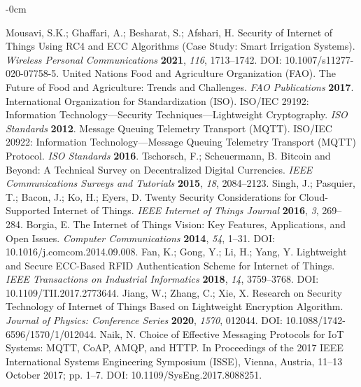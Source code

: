 \documentclass[journal]{Definitions/mdpi}
\begin{document}
\begin{adjustwidth}{-\extralength}{0cm}
\begin{thebibliography}{999}
Mousavi, S.K.; Ghaffari, A.; Besharat, S.; Afshari, H. Security of Internet of Things Using RC4 and ECC Algorithms (Case Study: Smart Irrigation Systems). {\em Wireless Personal Communications} {\bf 2021}, {\em 116}, 1713–1742. DOI: 10.1007/s11277-020-07758-5.
United Nations Food and Agriculture Organization (FAO). The Future of Food and Agriculture: Trends and Challenges. {\em FAO Publications} {\bf 2017}.
International Organization for Standardization (ISO). ISO/IEC 29192: Information Technology—Security Techniques—Lightweight Cryptography. {\em ISO Standards} {\bf 2012}.
Message Queuing Telemetry Transport (MQTT). ISO/IEC 20922: Information Technology—Message Queuing Telemetry Transport (MQTT) Protocol. {\em ISO Standards} {\bf 2016}.
Tschorsch, F.; Scheuermann, B. Bitcoin and Beyond: A Technical Survey on Decentralized Digital Currencies. {\em IEEE Communications Surveys and Tutorials} {\bf 2015}, {\em 18}, 2084–2123.
Singh, J.; Pasquier, T.; Bacon, J.; Ko, H.; Eyers, D. Twenty Security Considerations for Cloud-Supported Internet of Things. {\em IEEE Internet of Things Journal} {\bf 2016}, {\em 3}, 269–284.
Borgia, E. The Internet of Things Vision: Key Features, Applications, and Open Issues. {\em Computer Communications} {\bf 2014}, {\em 54}, 1–31. DOI: 10.1016/j.comcom.2014.09.008.
Fan, K.; Gong, Y.; Li, H.; Yang, Y. Lightweight and Secure ECC-Based RFID Authentication Scheme for Internet of Things. {\em IEEE Transactions on Industrial Informatics} {\bf 2018}, {\em 14}, 3759–3768. DOI: 10.1109/TII.2017.2773644.
Jiang, W.; Zhang, C.; Xie, X. Research on Security Technology of Internet of Things Based on Lightweight Encryption Algorithm. {\em Journal of Physics: Conference Series} {\bf 2020}, {\em 1570}, 012044. DOI: 10.1088/1742-6596/1570/1/012044.
Naik, N. Choice of Effective Messaging Protocols for IoT Systems: MQTT, CoAP, AMQP, and HTTP. In Proceedings of the 2017 IEEE International Systems Engineering Symposium (ISSE), Vienna, Austria, 11–13 October 2017; pp. 1–7. DOI: 10.1109/SysEng.2017.8088251.

\end{thebibliography}
\end{adjustwidth}
\end{document}
